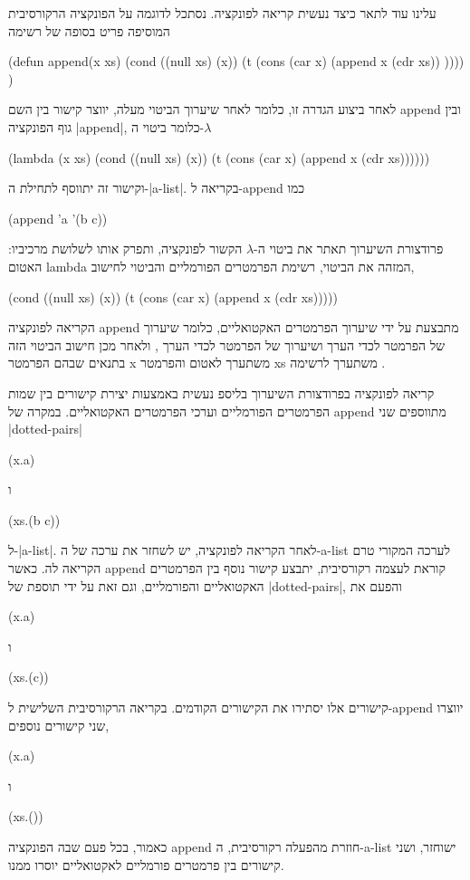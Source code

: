 \documentclass[a4paper,12pt,reqno]{article}
\begin{document}
עלינו עוד לתאר כיצד נעשית קריאה לפונקציה. נסתכל לדוגמה על הפונקציה הרקורסיבית המוסיפה פריט בסופה של רשימה
\begin{LISP}
(defun append(x xs)
  (cond 
    ((null xs) (x))
    (t 
      (cons 
        (car x)
        (append x  (cdr xs))
      ))))
)    
\end{LISP}
לאחר ביצוע הגדרה זו, כלומר לאחר שיערוך הביטוי מעלה, יווצר קישור בין השם append
ובין גוף הפונקציה \E|append|, כלומר ביטוי ה-$λ$
\begin{LISP}
(lambda (x xs)
  (cond 
    ((null xs) (x))
    (t 
      (cons 
        (car x)
        (append x  (cdr xs))))))
\end{LISP}
וקישור זה יתווסף לתחילת ה-\E|a-list|. בקריאה ל-append כמו
\begin{LISP}
(append 'a '(b c))
\end{LISP}

פרודצורת השיערוך תאתר את ביטוי ה-$λ$ הקשור לפונקציה, ותפרק אותו  לשלושת
מרכיביו:  האטום lambda המזהה את הביטוי, רשימת הפרמטרים הפורמליים 
והביטוי לחישוב,
\begin{LISP}
(cond 
  ((null xs) (x))
  (t 
    (cons 
      (car x)
      (append x  (cdr xs)))))
\end{LISP}
הקריאה לפונקציה append מתבצעת על ידי שיערוך הפרמטרים האקטואליים, כלומר שיערוך
של  הפרמטר  לכדי הערך  ושיערוך של הפרמטר  
לכדי הערך , ולאחר מכן חישוב  
הביטוי הזה בתנאים שבהם הפרמטר x משתערך לאטום
 והפרמטר xs משתערך לרשימה .  

קריאה לפונקציה בפרודצורת השיערוך בליספ נעשית באמצעות יצירת קישורים בין שמות הפרמטרים הפורמליים
וערכי הפרמטרים האקטואליים. במקרה של append מתווספים שני \E|dotted-pairs| 
\begin{LISP}
(x.a)
\end{LISP}
ו
\begin{LISP}
(xs.(b c))
\end{LISP}
ל-\E|a-list|.
לאחר הקריאה לפונקציה, יש לשחזר את ערכה של ה-a-list לערכה המקורי טרם הקריאה לה.
כאשר append קוראת לעצמה רקורסיבית, יתבצע קישור נוסף בין הפרמטרים האקטואליים והפורמליים, 
וגם זאת על ידי תוספת של \E|dotted-pairs|, והפעם את
\begin{LISP}
(x.a)
\end{LISP}
ו
\begin{LISP}
(xs.(c))
\end{LISP}
קישורים אלו יסתירו את הקישורים הקודמים.
בקריאה הרקורסיבית השלישית ל-append יווצרו שני קישורים נוספים, 
\begin{LISP}
(x.a)
\end{LISP}
ו
\begin{LISP}
(xs.())
\end{LISP}
כאמור, בכל פעם שבה הפונקציה append חוזרת מהפעלה רקורסיבית, 
ה-a-list ישוחזר, ושני קישורים בין פרמטרים פורמליים לאקטואליים יוסרו ממנו.
\end{document}
